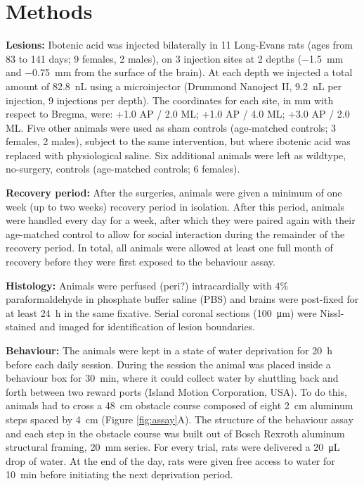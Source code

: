 \section{Methods}

\textbf{Lesions:} Ibotenic acid was injected bilaterally in 11 Long-Evans rats (ages from 83 to 141 days; 9 females, 2 males), on 3 injection sites at 2 depths (\SI{-1.5}{\milli\meter} and \SI{-0.75}{\milli\meter} from the surface of the brain). At each depth we injected a total amount of \SI{82.8}{\nano\liter} using a microinjector (Drummond Nanoject II, \SI{9.2}{\nano\liter} per injection, 9 injections per depth). The coordinates for each site, in \si{\milli\meter} with respect to Bregma, were: +1.0 AP / 2.0 ML; +1.0 AP / 4.0 ML; +3.0 AP / 2.0 ML. Five other animals were used as sham controls (age-matched controls; 3 females, 2 males), subject to the same intervention, but where ibotenic acid was replaced with physiological saline. Six additional animals were left as wildtype, no-surgery, controls (age-matched controls; 6 females).

\textbf{Recovery period:} After the surgeries, animals were given a minimum of one week (up to two weeks) recovery period in isolation. After this period, animals were handled every day for a week, after which they were paired again with their age-matched control to allow for social interaction during the remainder of the recovery period. In total, all animals were allowed at least one full month of recovery before they were first exposed to the behaviour assay.

\textbf{Histology:} Animals were perfused (peri?) intracardially with 4\% paraformaldehyde in phosphate buffer saline (PBS) and brains were post-fixed for at least \SI{24}{\hour} in the same fixative. Serial coronal sections (\SI{100}{\micro\meter}) were Nissl-stained and imaged for identification of lesion boundaries.

\textbf{Behaviour:} The animals were kept in a state of water deprivation for \SI{20}{\hour} before each daily session. During the session the animal was placed inside a behaviour box for \SI{30}{\minute}, where it could collect water by shuttling back and forth between two reward ports (Island Motion Corporation, USA). To do this, animals had to cross a \SI{48}{\centi\meter} obstacle course composed of eight \SI{2}{\centi\meter} aluminum steps spaced by \SI{4}{\centi\meter} (Figure \ref{fig:assay}A). The structure of the behaviour assay and each step in the obstacle course was built out of Bosch Rexroth aluminum structural framing, \SI{20}{\milli\meter} series. For every trial, rats were delivered a \SI{20}{\micro\liter} drop of water. At the end of the day, rats were given free access to water for \SI{10}{\minute} before initiating the next deprivation period.

